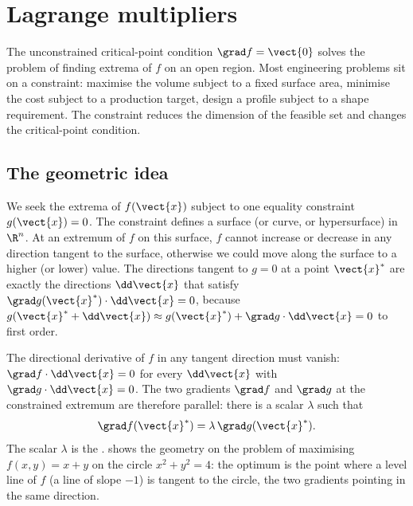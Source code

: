 \section{Lagrange multipliers}

The unconstrained critical-point condition $\grad f = \vect{0}$
solves the problem of finding extrema of $f$ on an open region. Most
engineering problems sit on a constraint: maximise the volume
subject to a fixed surface area, minimise the cost subject to a
production target, design a profile subject to a shape requirement.
The constraint reduces the dimension of the feasible set and changes
the critical-point condition.

\subsection{The geometric idea}

We seek the extrema of $f(\vect{x})$ subject to one equality
constraint $g(\vect{x}) = 0$. The constraint defines a surface (or
curve, or hypersurface) in $\R^{n}$. At an extremum of $f$ on this
surface, $f$ cannot increase or decrease in any direction tangent
to the surface, otherwise we could move along the surface to a
higher (or lower) value. The directions tangent to $g = 0$ at a
point $\vect{x}^{*}$ are exactly the directions $\dd\vect{x}$ that
satisfy $\grad g(\vect{x}^{*}) \cdot \dd\vect{x} = 0$, because
$g(\vect{x}^{*} + \dd\vect{x}) \approx g(\vect{x}^{*}) +
\grad g \cdot \dd\vect{x} = 0$ to first order.

The directional derivative of $f$ in any tangent direction must
vanish: $\grad f \cdot \dd\vect{x} = 0$ for every $\dd\vect{x}$ with
$\grad g \cdot \dd\vect{x} = 0$. The two gradients $\grad f$ and
$\grad g$ at the constrained extremum are therefore parallel: there
is a scalar $\lambda$ such that
\[
\grad f(\vect{x}^{*}) = \lambda\,\grad g(\vect{x}^{*}).
\]
The scalar $\lambda$ is the .
 shows the geometry on the
problem of maximising $f(x, y) = x + y$ on the circle $x^{2} + y^{2}
= 4$: the optimum is the point where a level line of $f$ (a line
of slope $-1$) is tangent to the circle, the two gradients pointing
in the same direction.




